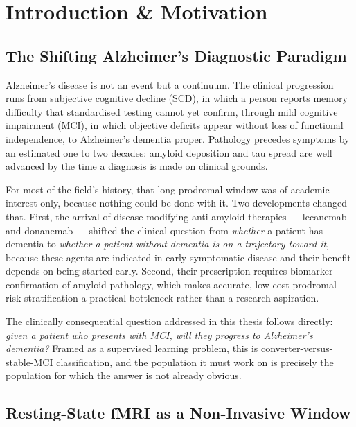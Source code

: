 \chapter{Introduction \& Motivation}
\label{ch:introduction}

\section{The Shifting Alzheimer's Diagnostic Paradigm}
\label{sec:paradigm}

Alzheimer's disease is not an event but a continuum. The clinical progression runs from
subjective cognitive decline (SCD), in which a person reports memory difficulty that
standardised testing cannot yet confirm, through mild cognitive impairment (MCI), in which
objective deficits appear without loss of functional independence, to Alzheimer's dementia
proper. Pathology precedes symptoms by an estimated one to two decades: amyloid deposition
and tau spread are well advanced by the time a diagnosis is made on clinical grounds.

For most of the field's history, that long prodromal window was of academic interest only,
because nothing could be done with it. Two developments changed that. First, the arrival
of disease-modifying anti-amyloid therapies --- lecanemab and donanemab --- shifted the
clinical question from \emph{whether} a patient has dementia to \emph{whether a patient
without dementia is on a trajectory toward it}, because these agents are indicated in
early symptomatic disease and their benefit depends on being started early. Second, their
prescription requires biomarker confirmation of amyloid pathology, which makes accurate,
low-cost prodromal risk stratification a practical bottleneck rather than a research
aspiration.

The clinically consequential question addressed in this thesis follows directly:
\emph{given a patient who presents with MCI, will they progress to Alzheimer's dementia?}
Framed as a supervised learning problem, this is converter-versus-stable-MCI
classification, and the population it must work on is precisely the population for which
the answer is not already obvious.

\section{Resting-State fMRI as a Non-Invasive Window}
\label{sec:rsfmri-motivation}

